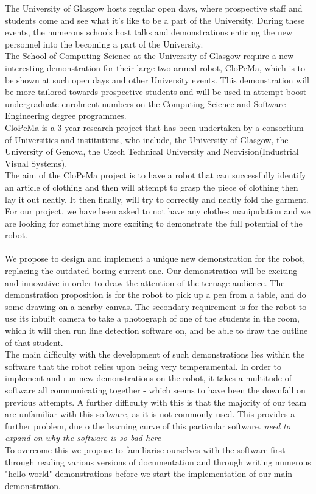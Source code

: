 \documentclass{l3proj}
\begin{document}
\noindent The University of Glasgow hosts regular open days, where prospective staff and students come and see what it's like to be a part of the University. During these events, the numerous schools host talks and demonstrations enticing the new personnel into the becoming a part of the University. \\
The School of Computing Science at the University of Glasgow require a new interesting demonstration for their large two armed robot, CloPeMa, which is to be shown at such open days and other University events. This demonstration will be more tailored towards prospective students and will be used in attempt boost undergraduate enrolment numbers on the Computing Science and Software Engineering degree programmes.\\
CloPeMa is a 3 year research project that has been undertaken by a consortium of Universities and institutions, who include, the University of Glasgow, the University of Genova, the Czech Technical University and Neovision(Industrial Visual Systems).\\
The aim of the CloPeMa project is to have a robot that can successfully identify an article of clothing and then will attempt to grasp the piece of clothing then lay it out neatly. It then finally, will try to correctly and neatly fold the garment. For our project, we have been asked to not have any clothes manipulation and we are looking for something more exciting to demonstrate the full potential of the robot. \\
\\
We propose to design and implement a unique new demonstration for the robot, replacing the outdated boring current one. Our demonstration will be exciting and innovative in order to draw the attention of the teenage audience. The demonstration proposition is for the robot to pick up a pen from a table, and do some drawing on a nearby canvas. The secondary requirement is for the robot to use its inbuilt camera to take a photograph of one of the students in the room, which it will then run line detection software on, and be able to draw the outline of that student.\\
The main difficulty with the development of such demonstrations lies within the software that the robot relies upon being very temperamental. In order to implement and run new demonstrations on the robot, it takes a multitude of software all communicating together - which seems to have been the downfall on previous attempts. A further difficulty with this is that the majority of our team are unfamiliar with this software, as it is not commonly used. This provides a further problem, due o the learning curve of this particular software. \textit{need to expand on why the software is so bad here} \\
To overcome this we propose to familiarise ourselves with the software first through reading various versions of documentation and through writing numerous "hello world" demonstrations before we start the implementation of our main demonstration.\\
\end{document}
